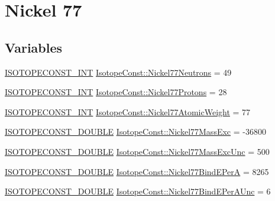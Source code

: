 \hypertarget{group___isotope_const-_nickel-_ni77}{}\section{Nickel 77}
\label{group___isotope_const-_nickel-_ni77}
\subsection*{Variables}
\begin{DoxyCompactItemize}
\item 
\mbox{\hyperlink{group___isotope_const-_macros_ga5f18360b3e99483a35c32d789e62621c}{I\+S\+O\+T\+O\+P\+E\+C\+O\+N\+S\+T\+\_\+\+I\+NT}} \mbox{\hyperlink{group___isotope_const-_nickel-_ni77_ga28125479c838c5a15ec10650762cd8b4}{Isotope\+Const\+::\+Nickel77\+Neutrons}} = 49
\item 
\mbox{\hyperlink{group___isotope_const-_macros_ga5f18360b3e99483a35c32d789e62621c}{I\+S\+O\+T\+O\+P\+E\+C\+O\+N\+S\+T\+\_\+\+I\+NT}} \mbox{\hyperlink{group___isotope_const-_nickel-_ni77_ga4c9e5bf26cbaecfd4531771a40598d36}{Isotope\+Const\+::\+Nickel77\+Protons}} = 28
\item 
\mbox{\hyperlink{group___isotope_const-_macros_ga5f18360b3e99483a35c32d789e62621c}{I\+S\+O\+T\+O\+P\+E\+C\+O\+N\+S\+T\+\_\+\+I\+NT}} \mbox{\hyperlink{group___isotope_const-_nickel-_ni77_ga90940dce71dab8ac49f07c2e46f87351}{Isotope\+Const\+::\+Nickel77\+Atomic\+Weight}} = 77
\item 
\mbox{\hyperlink{group___isotope_const-_macros_ga8f45a7272ce02c0b4c65c44636ed719a}{I\+S\+O\+T\+O\+P\+E\+C\+O\+N\+S\+T\+\_\+\+D\+O\+U\+B\+LE}} \mbox{\hyperlink{group___isotope_const-_nickel-_ni77_ga3c7501a948676bf78fd29b1f47511cf8}{Isotope\+Const\+::\+Nickel77\+Mass\+Exc}} = -\/36800
\item 
\mbox{\hyperlink{group___isotope_const-_macros_ga8f45a7272ce02c0b4c65c44636ed719a}{I\+S\+O\+T\+O\+P\+E\+C\+O\+N\+S\+T\+\_\+\+D\+O\+U\+B\+LE}} \mbox{\hyperlink{group___isotope_const-_nickel-_ni77_ga1d947bad7c8c8cc381b6357756ad610e}{Isotope\+Const\+::\+Nickel77\+Mass\+Exc\+Unc}} = 500
\item 
\mbox{\hyperlink{group___isotope_const-_macros_ga8f45a7272ce02c0b4c65c44636ed719a}{I\+S\+O\+T\+O\+P\+E\+C\+O\+N\+S\+T\+\_\+\+D\+O\+U\+B\+LE}} \mbox{\hyperlink{group___isotope_const-_nickel-_ni77_ga62187619352e3767ff018ada30003841}{Isotope\+Const\+::\+Nickel77\+Bind\+E\+PerA}} = 8265
\item 
\mbox{\hyperlink{group___isotope_const-_macros_ga8f45a7272ce02c0b4c65c44636ed719a}{I\+S\+O\+T\+O\+P\+E\+C\+O\+N\+S\+T\+\_\+\+D\+O\+U\+B\+LE}} \mbox{\hyperlink{group___isotope_const-_nickel-_ni77_ga949ec159456326726b8d7ae4d6b2df7a}{Isotope\+Const\+::\+Nickel77\+Bind\+E\+Per\+A\+Unc}} = 6

\end{DoxyCompactItemize}
